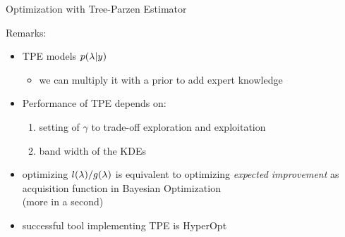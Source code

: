 \begin{frame}[c,fragile]{Optimization with Tree-Parzen Estimator }


Remarks:

\begin{itemize}
	\item TPE models $p(\mathbf{\lambda} | y)$
	\begin{itemize}
		\item we can multiply it with a prior to add expert knowledge
	\end{itemize}
	\smallskip
	\pause
	\item Performance of TPE depends on:
	\begin{enumerate}
		\item setting of $\gamma$ to trade-off exploration and exploitation
		\item band width of the KDEs 
	\end{enumerate}
	\pause
	\smallskip
	\item optimizing $l(\mathbf{\lambda})/g(\mathbf{\lambda})$ is equivalent to optimizing \emph{expected improvement} as acquisition function in Bayesian Optimization\\ (more in a second)
	\pause
	\smallskip
	\item successful tool implementing TPE is HyperOpt
\end{itemize}

\end{frame}
